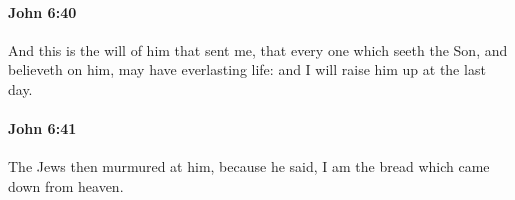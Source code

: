 		\paragraph{John 6:40} %
			\label{JOHN-6-40}

			And this is the will of him that sent me, that every one which seeth the Son, and believeth on him, may have everlasting life: and I will raise him up at the last day.

			\begin{framed}
			\scriptsize
				\begin{compactdesc}
					\item[SBLG] 
				\end{compactdesc}
			\end{framed}

		\paragraph{John 6:41} %
			\label{JOHN-6-41}

			The Jews then murmured at him, because he said, I am the bread which came down from heaven.

